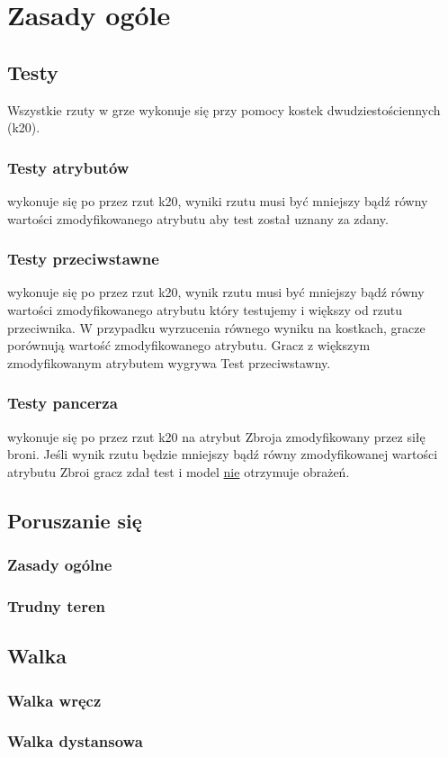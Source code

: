 \chapter{Zasady ogóle}

\section{Testy}

Wszystkie rzuty w grze wykonuje się przy pomocy kostek dwudziestościennych (k20).

\subsection{Testy atrybutów} wykonuje się po przez rzut k20, wyniki rzutu musi być mniejszy bądź równy wartości zmodyfikowanego atrybutu aby test został uznany za zdany. 

\subsection{Testy przeciwstawne} wykonuje się po przez rzut k20, wynik rzutu musi być mniejszy bądź równy wartości zmodyfikowanego atrybutu który testujemy i większy od rzutu przeciwnika. W przypadku wyrzucenia równego wyniku na kostkach, gracze porównują wartość zmodyfikowanego atrybutu. Gracz z większym zmodyfikowanym atrybutem wygrywa Test przeciwstawny. 
\subsection{Testy pancerza} wykonuje się po przez rzut k20 na atrybut Zbroja zmodyfikowany przez siłę broni. Jeśli wynik rzutu będzie mniejszy bądź równy zmodyfikowanej wartości atrybutu Zbroi gracz zdał test i model \underline{nie} otrzymuje obrażeń.


\section{Poruszanie się}
\subsection{Zasady ogólne}
\subsection{Trudny teren}

\section{Walka}
\subsection{Walka wręcz}
\subsection{Walka dystansowa}




